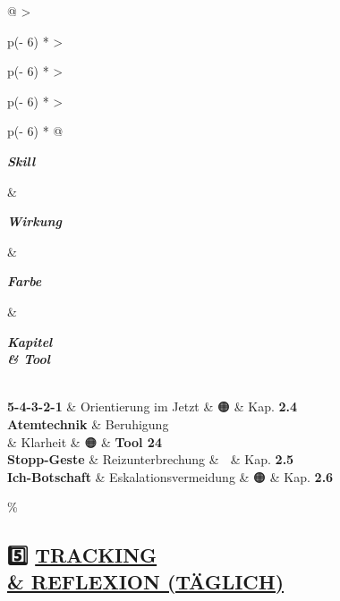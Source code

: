 \begin{longtable}[]{@{}
  >{\raggedright\arraybackslash}p{(\columnwidth - 6\tabcolsep) * }
  >{\raggedright\arraybackslash}p{(\columnwidth - 6\tabcolsep) * }
  >{\raggedright\arraybackslash}p{(\columnwidth - 6\tabcolsep) * }
  >{\raggedright\arraybackslash}p{(\columnwidth - 6\tabcolsep) * }@{}}
\toprule\noalign{}
\begin{minipage}[b]{\linewidth}\raggedright
\emph{\textbf{Skill}}
\end{minipage} \& \begin{minipage}[b]{\linewidth}\raggedright
\emph{\textbf{Wirkung}}
\end{minipage} \& \begin{minipage}[b]{\linewidth}\raggedright
\emph{\textbf{Farbe}}
\end{minipage} \& \begin{minipage}[b]{\linewidth}\raggedright
\emph{\textbf{Kapitel \\& Tool}}
\end{minipage} \\
\midrule\noalign{}
\endhead
\bottomrule\noalign{}
\endlastfoot
\textbf{5-4-3-2-1} \& Orientierung im Jetzt \& 🟠 \& Kap. \textbf{2.4} \\
\textbf{Atemtechnik} \& Beruhigung \\& Klarheit \& 🟠 \& \textbf{Tool 24} \\
\textbf{Stopp-Geste} \& Reizunterbrechung \& 🔴 \& Kap. \textbf{2.5} \\
\textbf{Ich-Botschaft} \& Eskalationsvermeidung \& 🟠 \& Kap. \textbf{2.6} \\
\end{longtable}

\hypertarget{tracking-reflexion-tuxe4glich}{\%
\subsection{\texorpdfstring{5️⃣ \textbf{\ul{TRACKING \\& REFLEXION (TÄGLICH)}}}{5️⃣ TRACKING \\& REFLEXION (TÄGLICH)}}\label{tracking-reflexion-tuxe4glich}}

